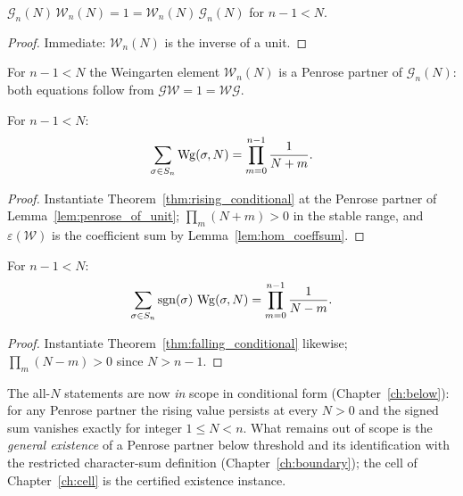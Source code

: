 \begin{theorem}\label{thm:gram_mul}
\leanok
{}
$\mathcal G_n(N)\,\mathcal W_n(N)=1=\mathcal W_n(N)\,\mathcal G_n(N)$
for $n-1<N$.
\end{theorem}
\begin{proof}
\leanok
{}
Immediate: $\mathcal W_n(N)$ is the inverse of a unit.
\end{proof}


\begin{lemma}\label{lem:penrose_of_unit}
\leanok
{}
For $n-1<N$ the Weingarten element $\mathcal W_n(N)$ is a Penrose partner
of $\mathcal G_n(N)$: both equations follow from
$\mathcal G\mathcal W=1=\mathcal W\mathcal G$.
\end{lemma}

\begin{theorem}\label{thm:rising}
\leanok
{}
For $n-1<N$:
\[
\sum_{\sigma\in S_n}\operatorname{Wg}(\sigma,N)=\prod_{m=0}^{n-1}\frac1{N+m}.
\]
\end{theorem}
\begin{proof}
\leanok
{}
Instantiate Theorem~\ref{thm:rising_conditional} at the Penrose partner of
Lemma~\ref{lem:penrose_of_unit}; $\prod_m(N+m)>0$ in the stable range, and
$\varepsilon(\mathcal W)$ is the coefficient sum by
Lemma~\ref{lem:hom_coeffsum}.
\end{proof}

\begin{theorem}\label{thm:falling}
\leanok
{}
For $n-1<N$:
\[
\sum_{\sigma\in S_n}\operatorname{sgn}(\sigma)\,\operatorname{Wg}(\sigma,N)
=\prod_{m=0}^{n-1}\frac1{N-m}.
\]
\end{theorem}
\begin{proof}
\leanok
{}
Instantiate Theorem~\ref{thm:falling_conditional} likewise;
$\prod_m(N-m)>0$ since $N>n-1$.
\end{proof}

\begin{remark}\label{rem:allN}
The all-$N$ statements are now \emph{in} scope in conditional form
(Chapter~\ref{ch:below}): for any Penrose partner the rising value
persists at every $N>0$ and the signed sum vanishes exactly for integer
$1\le N<n$. What remains out of scope is the \emph{general existence} of
a Penrose partner below threshold and its identification with the
restricted character-sum definition (Chapter~\ref{ch:boundary}); the cell
of Chapter~\ref{ch:cell} is the certified existence instance.
\end{remark}

